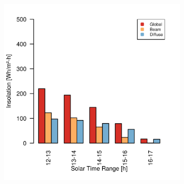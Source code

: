 \begin{figure}[h]
\captionsetup[subfigure]{justification=centering}
\vspace{-2ex}
\centering
    \setlength{\subfigureWidth}{0.50\textwidth}
    \setlength{\graphicsHeight}{80mm}
    \hypersetup{hidelinks=true}%
    \begin{subfigure}[t]{\subfigureWidth}
        \centering
            \includegraphics[height=\graphicsHeight]{sections/mars-solar-energy/solar-radiation/plots/ih-ibh-and-idh-variation-1-for-ls-71-phi-34-tau-04-and-albedo-027.png}
            \label{fig:plot:sub:insolation-phi-m34}
    \end{subfigure}\hfill
    \begin{subfigure}[t]{\subfigureWidth}
        \centering

\end{subfigure}
\end{figure}
